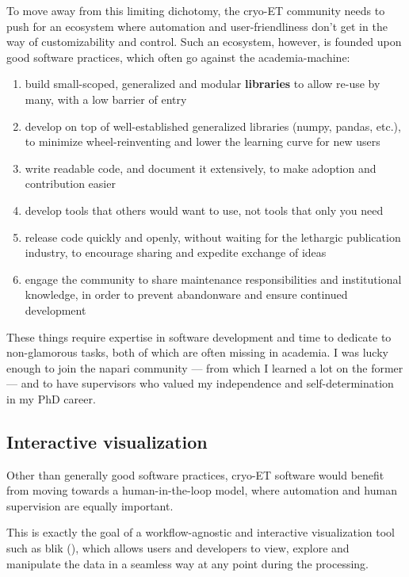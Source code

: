 To move away from this limiting dichotomy, the cryo-ET community needs to push for an ecosystem where automation and user-friendliness don't get in the way of customizability and control.
Such an ecosystem, however, is founded upon good software practices, which often go against the academia-machine:

\begin{enumerate}[noitemsep]
    \item build small-scoped, generalized and modular \textbf{libraries} to allow re-use by many, with a low barrier of entry
    \item develop on top of well-established generalized libraries (numpy, pandas, etc.), to minimize wheel-reinventing and lower the learning curve for new users
    \item write readable code, and document it extensively, to make adoption and contribution easier
    \item develop tools that others would want to use, not tools that only you need
    \item release code quickly and openly, without waiting for the lethargic publication industry, to encourage sharing and expedite exchange of ideas
    \item engage the community to share maintenance responsibilities and institutional knowledge, in order to prevent abandonware and ensure continued development
\end{enumerate}

These things require expertise in software development and time to dedicate to non-glamorous tasks, both of which are often missing in academia.
I was lucky enough to join the napari community --- from which I learned a lot on the former --- and to have supervisors who valued my independence and self-determination in my PhD career.

\subsection{Interactive visualization}

Other than generally good software practices, cryo-ET software would benefit from moving towards a human-in-the-loop model, where automation and human supervision are equally important.

This is exactly the goal of a workflow-agnostic and interactive visualization tool such as blik (), which allows users and developers to view, explore and manipulate the data in a seamless way at any point during the processing.

